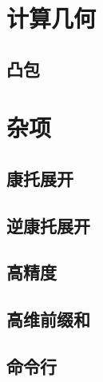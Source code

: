 \documentclass{article}
\begin{document}
\begin{multicols*}{2}
\section{计算几何}
\subsection{凸包}
\begin{small}

\end{small}

\section{杂项}
\subsection{康托展开}
\begin{small}

\end{small}

\subsection{逆康托展开}
\begin{small}

\end{small}

\subsection{高精度}
\begin{small}

\end{small}

\subsection{高维前缀和}
\begin{small}

\end{small}

\subsection{命令行}

\begin{small}

\end{small}
\end{multicols*}
\end{document}
